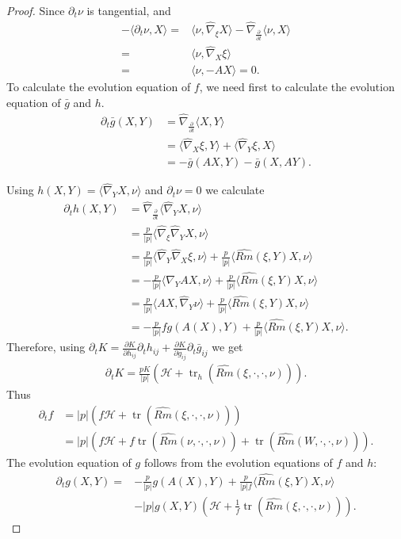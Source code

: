 \documentclass{amsart}
\theoremstyle{definition}
\theoremstyle{remark}
\numberwithin{equation}{section}
\begin{document}
\begin{proof}
Since $\partial_t \nu$ is tangential, and
\begin{align*}
-\langle \partial_t\nu,X\rangle=&\langle \nu,\hat{\nabla}_{\xi}X\rangle-\hat{\nabla}_{\frac{\partial}{\partial t}}\langle \nu,X \rangle \\
=&\langle \nu,\hat{\nabla}_{X}\xi\rangle\\
=&\langle \nu,-AX\rangle=0.
\end{align*}
To calculate the evolution equation of $ f $, we need first to calculate the evolution equation of $\bar{g}$ and $h.$
\begin{align*}
\partial_t \bar{g}(X,Y)&=\hat{\nabla}_{\frac{\partial}{\partial t}}\langle X,Y\rangle\\
&=\langle \hat{\nabla}_X\xi,Y\rangle+\langle \hat{\nabla}_Y\xi,X\rangle\\
&=-\bar{g}( AX,Y)-\bar{g}(X,AY).
\end{align*}



Using $h(X,Y)=\langle \hat{\nabla}_{Y}X, \nu\rangle$ and $\partial_t\nu=0$ we calculate
\begin{align*}
\partial_t h(X,Y)&=\hat{\nabla}_{\frac{\partial}{\partial t}}\langle \hat{\nabla}_{Y}X,\nu\rangle\\
&=\frac{p}{|p|}\langle \hat{\nabla}_{\xi}\hat{\nabla}_{Y}X,\nu\rangle\\
&=\frac{p}{|p|}\langle \hat{\nabla}_{Y}\hat{\nabla}_{X}\xi,\nu\rangle+ \frac{p}{|p|}\langle \widehat{Rm}(\xi,Y)X,\nu\rangle\\
&=-\frac{p}{|p|}\langle \hat{\nabla}_{Y}AX,\nu\rangle+ \frac{p}{|p|}\langle \widehat{Rm}(\xi,Y)X,\nu\rangle\\
&=\frac{p}{|p|}\langle AX,\hat{\nabla}_{Y}\nu\rangle+ \frac{p}{|p|}\langle \widehat{Rm}(\xi,Y)X,\nu\rangle\\
&=-\frac{p}{|p|} f  g(A(X),Y)+\frac{p}{|p|}\langle \widehat{Rm}(\xi,Y)X,\nu\rangle.
\end{align*}
Therefore, using $\partial_t K=\frac{\partial K}{\partial h_{ij}}\partial_th_{ij}+\frac{\partial K}{\partial \bar{g}_{ij}}\partial_t\bar{g}_{ij}$ we get
\begin{align*}
\partial_tK=\frac{pK}{|p|}(\mathcal{H}+\operatorname{tr}_h (\widehat{Rm}(\xi,\cdot,\cdot,\nu))).
\end{align*}
Thus
\begin{align}
 \partial_tf&=|p|(f\mathcal{H}+\operatorname{tr} (\widehat{Rm}(\xi,\cdot,\cdot,\nu)))\nonumber\\
&= |p|(f\mathcal{H}+f\operatorname{tr} (\widehat{Rm}(\nu,\cdot,\cdot,\nu))+\operatorname{tr} (\widehat{Rm}(W,\cdot,\cdot,\nu))).
\end{align}
The evolution equation of $g$ follows from the evolution equations of $ f $ and $h:$
\begin{align*}
\partial_tg(X,Y)=&-\frac{p}{|p|}g(A(X),Y)+\frac{p}{|p|f}\langle \widehat{Rm}(\xi,Y)X,\nu\rangle\\
&-
|p|g(X,Y)(\mathcal{H}+\frac{1}{f}\operatorname{tr} (\widehat{Rm}(\xi,\cdot,\cdot,\nu))).
\end{align*}


\end{proof}
\end{document}
